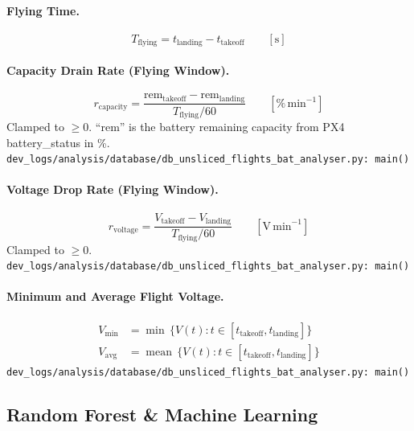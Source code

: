 \medskip
\paragraph{Flying Time.}
\begin{equation}
    T_{\text{flying}} = t_{\text{landing}} - t_{\text{takeoff}} \qquad [\mathrm{s}]
\end{equation}

\medskip
\paragraph{Capacity Drain Rate (Flying Window).}
\begin{equation}
    r_{\text{capacity}} = \frac{\mathrm{rem}_{\text{takeoff}} - \mathrm{rem}_{\text{landing}}}{T_{\text{flying}} / 60} \qquad [\%\, \mathrm{min}^{-1}]
\end{equation}
Clamped to $\ge 0$. ``rem'' is the battery remaining capacity from PX4 battery\_status in \%.\\
\texttt{\small dev\_logs/analysis/database/db\_unsliced\_flights\_bat\_analyser.py:\ main()}

\medskip
\paragraph{Voltage Drop Rate (Flying Window).}
\begin{equation}
    r_{\text{voltage}} = \frac{V_{\text{takeoff}} - V_{\text{landing}}}{T_{\text{flying}} / 60} \qquad [\mathrm{V\,min}^{-1}]
\end{equation}
Clamped to $\ge 0$.\\
\texttt{\small dev\_logs/analysis/database/db\_unsliced\_flights\_bat\_analyser.py:\ main()}

\medskip
\paragraph{Minimum and Average Flight Voltage.}
\begin{align}
    V_{\min} &= \min\, \{ V(t) : t \in [t_{\text{takeoff}}, t_{\text{landing}}] \} \\
    V_{\text{avg}} &= \operatorname{mean}\, \{ V(t) : t \in [t_{\text{takeoff}}, t_{\text{landing}}] \}
\end{align}
\texttt{\small dev\_logs/analysis/database/db\_unsliced\_flights\_bat\_analyser.py:\ main()}

\subsection{Random Forest \& Machine Learning}

